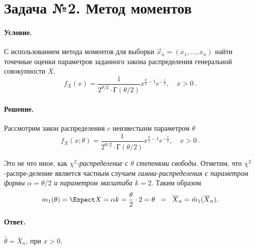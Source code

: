
\section{Задача №2. Метод моментов}

\paragraph{Условие.} С использованием метода моментов для выборки $\vec{x}_n = (x_1, \dots, x_n)$ найти точечные оценки параметров заданного закона распределения генеральной совокупности $X$.
\[
    f_X (x) = \frac{1}{2^{\theta/2} \cdot \textsf{Г} (\theta/2)} x^{\frac{\theta}{2} - 1} e^{-\frac{x}{2}}, \quad x > 0\,.
\]

\paragraph{Решение.}
Рассмотрим закон распределения c неизвестынм параметром $\theta$
\[
    f_X (x; \theta) = \frac{1}{2^{\theta/2} \cdot \textsf{Г} (\theta/2)} x^{\frac{\theta}{2} - 1} e^{-\frac{x}{2}}, \quad x > 0\,.
\]

\noindent
Это не что иное, как \emph{$\chi^2$-распределение с $\theta$ степенями свободы}. Отметим, что $\chi^2$-распре-деление является частным случаем \emph{гамма-распределения с параметром формы $\alpha = \theta/2$ и параметром масштаба $k = 2$}. Таким образом
\[
    m_1(\theta) = \Expect X = \alpha k = \frac{\theta}{2} \cdot 2 = \theta \;\; = \;\; \overline{X}_n = \hat{m}_1(\overline{X}_n).
\]

\paragraph{Ответ.} $\hat\theta = \overline{X}_n$, при $x > 0$.